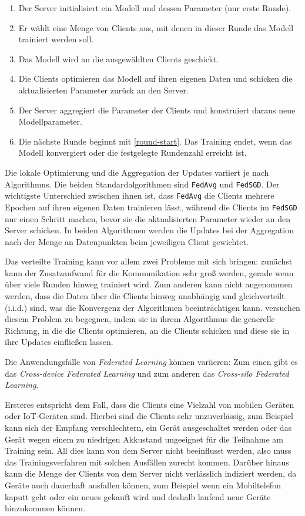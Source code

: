 \begin{enumerate}
	\item Der Server initialisiert ein Modell und dessen Parameter (nur erste Runde). 
	\item \label{round-start} Er wählt eine Menge von Clients aus, mit denen in dieser Runde das Modell trainiert werden soll.
	\item Das Modell wird an die ausgewählten Clients geschickt.
	\item Die Clients optimieren das Modell auf ihren eigenen Daten und schicken die aktualisierten Parameter zurück an den Server.
	\item Der Server aggregiert die Parameter der Clients und konstruiert daraus neue Modellparameter.
	\item Die nächste Runde beginnt mit \autoref{round-start}. Das Training endet, wenn das Modell konvergiert oder die festgelegte Rundenzahl erreicht ist.
\end{enumerate}

Die lokale Optimierung und die Aggregation der Updates variiert je nach Algorithmus. Die beiden Standardalgorithmen sind \texttt{FedAvg} und \texttt{FedSGD}\cite{mcmahan:2016}. Der wichtigste Unterschied zwischen ihnen ist, dass \texttt{FedAvg} die Clients mehrere Epochen auf ihren eigenen Daten trainieren lässt, während die Clients im \texttt{FedSGD} nur einen Schritt machen, bevor sie die aktualisierten Parameter wieder an den Server schicken. In beiden Algorithmen werden die Updates bei der Aggregation nach der Menge an Datenpunkten beim jeweiligen Client gewichtet.

Das verteilte Training kann vor allem zwei Probleme mit sich bringen: zunächst kann der Zusatzaufwand für die Kommunikation sehr groß werden, gerade wenn über viele Runden hinweg trainiert wird. Zum anderen kann nicht angenommen werden, dass die Daten über die Clients hinweg unabhängig und gleichverteilt (i.i.d.) sind, was die Konvergenz der Algorithmen beeinträchtigen kann. \textcite{karimireddy:2020} versuchen diesem Problem zu begegnen, indem sie in ihrem Algorithmus die generelle Richtung, in die die Clients optimieren, an die Clients schicken und diese sie in ihre Updates einfließen lassen.

Die Anwendungsfälle von \textit{Federated Learning} können variieren: Zum einen gibt es das \textit{Cross-device Federated Learning} und zum anderen das \textit{Cross-silo Federated Learning}\cite{kairouz:2021}. 

Ersteres entspricht dem Fall, dass die Clients eine Vielzahl von mobilen Geräten oder IoT-Geräten sind. Hierbei sind die Clients sehr unzuverlässig, zum Beispiel kann sich der Empfang verschlechtern, ein Gerät ausgeschaltet werden oder das Gerät wegen einem zu niedrigen Akkustand ungeeignet für die Teilnahme am Training sein. All dies kann von dem Server nicht beeinflusst werden, also muss das Trainingsverfahren mit solchen Ausfällen zurecht kommen. Darüber hinaus kann die Menge der Clients von dem Server nicht verlässlich indiziert werden, da Geräte auch dauerhaft ausfallen können, zum Beispiel wenn ein Mobiltelefon kaputt geht oder ein neues gekauft wird und deshalb laufend neue Geräte hinzukommen können.

